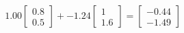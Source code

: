 \documentclass[preview]{standalone}
\begin{document}
\begin{align*}
1.00 \begin{bmatrix} 0.8 \\ 0.5 \end{bmatrix} + -1.24 \begin{bmatrix} 1 \\ 1.6 \end{bmatrix} = \begin{bmatrix} -0.44 \\ -1.49 \end{bmatrix}
\end{align*}
\end{document}
